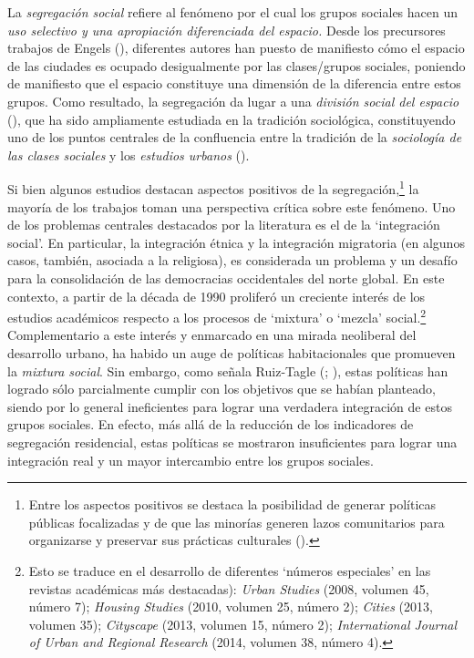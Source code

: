 \documentclass[
  spanish,
  a4paper,%
  chapterprefix=true,%
  DIV=calc,%
  twoside]{scrbook}%
\begin{document}
La \emph{segregación social} refiere al fenómeno por el cual los grupos
sociales hacen un \emph{uso selectivo y una apropiación diferenciada del
espacio.} Desde los precursores trabajos de Engels (), diferentes
autores han puesto de manifiesto cómo el espacio de las ciudades es
ocupado desigualmente por las clases/grupos sociales, poniendo de
manifiesto que el espacio constituye una dimensión de la diferencia
entre estos grupos. Como resultado, la segregación da lugar a una
\emph{división social del espacio} (), que ha sido ampliamente
estudiada en la tradición sociológica, constituyendo uno de los puntos
centrales de la confluencia entre la tradición de la \emph{sociología de las
clases sociales} y los \emph{estudios urbanos} ().

Si bien algunos estudios destacan aspectos positivos de la
segregación,\footnote{Entre los aspectos positivos se destaca la
  posibilidad de generar políticas públicas focalizadas y de que las
  minorías generen lazos comunitarios para organizarse y preservar sus
  prácticas culturales ().} la mayoría de los trabajos toman una
perspectiva crítica sobre este fenómeno. Uno de los problemas centrales
destacados por la literatura es el de la `integración social'. En
particular, la integración étnica y la integración migratoria (en
algunos casos, también, asociada a la religiosa), es considerada un
problema y un desafío para la consolidación de las democracias
occidentales del norte global. En este contexto, a partir de la década
de 1990 proliferó un creciente interés de los estudios académicos
respecto a los procesos de `mixtura' o `mezcla'
social.\footnote{Esto se traduce en el desarrollo de diferentes
  `números especiales' en las revistas académicas más destacadas):
  \emph{Urban Studies} (2008, volumen 45, número 7); \emph{Housing Studies}
  (2010, volumen 25, número 2); \emph{Cities} (2013, volumen 35);
  \emph{Cityscape} (2013, volumen 15, número 2); \emph{International Journal of
  Urban and Regional Research} (2014, volumen 38, número 4).} Complementario a este interés y enmarcado en
una mirada neoliberal del desarrollo urbano, ha habido un auge de
políticas habitacionales que promueven la \emph{mixtura social}. Sin embargo,
como señala Ruiz-Tagle (; ), estas
políticas han logrado sólo parcialmente cumplir con los objetivos que se
habían planteado, siendo por lo general ineficientes para lograr una
verdadera integración de estos grupos sociales. En efecto, más allá de
la reducción de los indicadores de segregación residencial, estas
políticas se mostraron insuficientes para lograr una integración real y
un mayor intercambio entre los grupos sociales.
\end{document}
